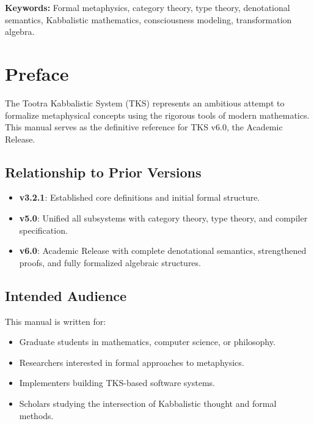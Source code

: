 \documentclass[11pt,twoside,openright]{book}
\theoremstyle{definition}
\theoremstyle{plain}
\theoremstyle{remark}
\begin{document}
\vspace{1em}
\noindent\textbf{Keywords:} Formal metaphysics, category theory, type theory, denotational semantics, Kabbalistic mathematics, consciousness modeling, transformation algebra.

\tableofcontents

\chapter*{Preface}

The Tootra Kabbalistic System (TKS) represents an ambitious attempt to formalize metaphysical concepts using the rigorous tools of modern mathematics. This manual serves as the definitive reference for TKS v6.0, the Academic Release.

\section*{Relationship to Prior Versions}

\begin{itemize}
  \item \textbf{v3.2.1}: Established core definitions and initial formal structure.
  \item \textbf{v5.0}: Unified all subsystems with category theory, type theory, and compiler specification.
  \item \textbf{v6.0}: Academic Release with complete denotational semantics, strengthened proofs, and fully formalized algebraic structures.
\end{itemize}

\section*{Intended Audience}

This manual is written for:
\begin{itemize}
  \item Graduate students in mathematics, computer science, or philosophy.
  \item Researchers interested in formal approaches to metaphysics.
  \item Implementers building TKS-based software systems.
  \item Scholars studying the intersection of Kabbalistic thought and formal methods.
\end{itemize}
\end{document}
